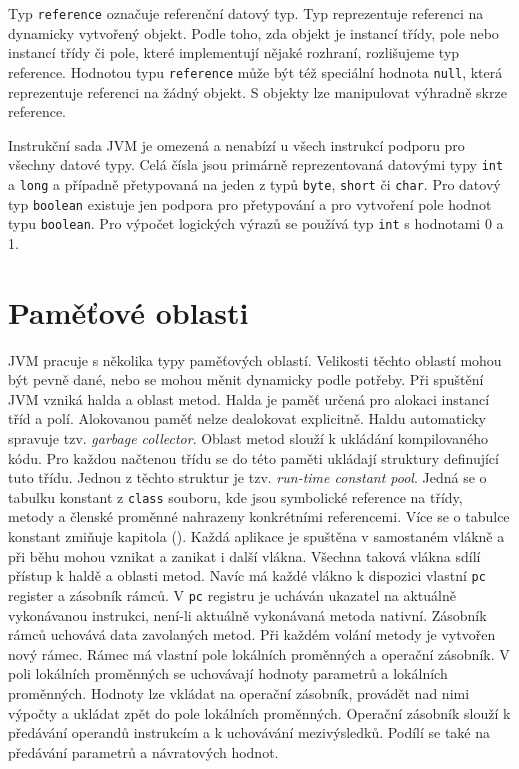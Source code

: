 Typ \texttt{reference} označuje referenční datový typ. Typ reprezentuje referenci na dynamicky vytvořený objekt. Podle toho, zda objekt je instancí třídy, pole nebo instancí třídy či pole, které implementují nějaké rozhraní, rozlišujeme typ reference. Hodnotou typu \texttt{reference} může být též speciální hodnota \texttt{null}, která reprezentuje referenci na žádný objekt. S objekty lze manipulovat výhradně skrze reference.





Instrukční sada JVM je omezená a nenabízí u všech instrukcí podporu pro všechny datové typy. Celá čísla jsou primárně reprezentovaná datovými typy \texttt{int} a \texttt{long} a případně přetypovaná na jeden z typů \texttt{byte}, \texttt{short} či \texttt{char}. Pro datový typ \texttt{boolean} existuje jen podpora pro přetypování a pro vytvoření pole hodnot typu \texttt{boolean}. Pro výpočet logických výrazů se používá typ \texttt{int} s hodnotami 0 a 1.


\section{Paměťové oblasti}

JVM pracuje s několika typy paměťových oblastí. Velikosti těchto oblastí mohou být pevně dané, nebo se mohou měnit dynamicky podle potřeby. Při spuštění JVM vzniká halda a oblast metod. Halda je paměť určená pro alokaci instancí tříd a polí. Alokovanou paměť nelze dealokovat explicitně. Haldu automaticky spravuje tzv. \textit{garbage collector}. Oblast metod slouží k ukládání kompilovaného kódu. Pro každou načtenou třídu se do této paměti ukládají struktury definující tuto třídu. Jednou z těchto struktur je tzv. \textit{run-time constant pool}. Jedná se o tabulku konstant z \texttt{class} souboru, kde jsou symbolické reference na třídy, metody a členské proměnné nahrazeny konkrétními referencemi. Více se o tabulce konstant zmiňuje kapitola (). Každá aplikace je spuštěna v samostaném vlákně a při běhu mohou vznikat a zanikat i další vlákna. Všechna taková vlákna sdílí přístup k haldě a oblasti metod. Navíc má každé vlákno k dispozici vlastní \texttt{pc} register a zásobník rámců. V \texttt{pc} registru je ucháván ukazatel na aktuálně vykonávanou instrukci, není-li aktuálně vykonávaná metoda nativní. Zásobník rámců uchovává data zavolaných metod. Při každém volání metody je vytvořen nový rámec. Rámec má vlastní pole lokálních proměnných a operační zásobník. V poli lokálních proměnných se uchovávají hodnoty parametrů a lokálních proměnných. Hodnoty lze vkládat na operační zásobník, provádět nad nimi výpočty a ukládat zpět do pole lokálních proměnných. Operační zásobník slouží k předávání operandů instrukcím a k uchovávání mezivýsledků. Podílí se také na předávání parametrů a návratových hodnot.

